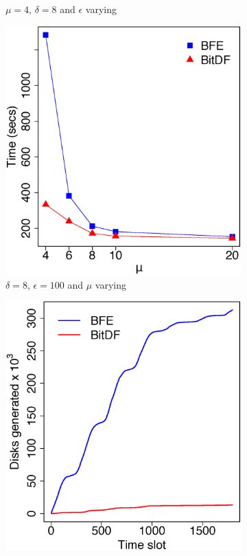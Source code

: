 \begin{figure}
\begin{subfigure}[t]{0.48\textwidth}
        \caption{$\mu = 4$, $\delta = 8$ and $\epsilon$ varying}
        \label{fig:tdrive_vary_g}
    \end{subfigure}
    \begin{subfigure}[t]{0.48\textwidth}
        \includegraphics[width=\textwidth]{images/TDrive_l_8_g_100_varying_n.eps}
        \caption{$\delta = 8$, $\epsilon = 100$ and $\mu$ varying}
        \label{fig:tdrive_vary_n}
    \end{subfigure}
    \begin{subfigure}[t]{0.48\textwidth}
        \includegraphics[width=\textwidth]{images/TDrive_d.eps}

\end{subfigure}
\end{figure}
